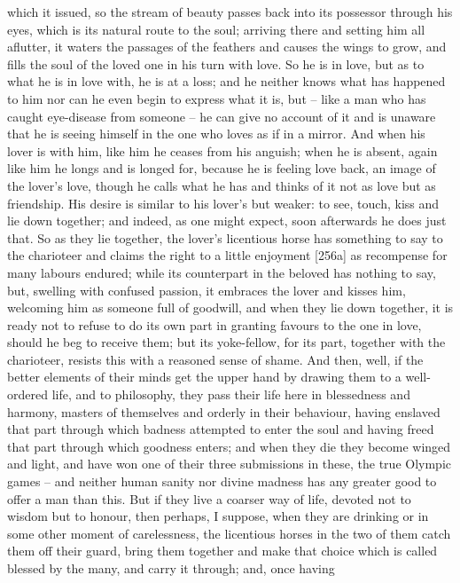  which it issued, so the stream of beauty passes back into its
possessor through his
eyes, which is its natural route to the soul; arriving there and setting
him all aflutter, it waters the  passages of the feathers and
causes the wings to grow, and fills the soul of the loved one in his
turn with love. So he is in love, but as to what he is in love with, he
is at a loss; and he neither knows what has happened to him nor can he
even begin to express what it is, but -- like a man who has caught
eye-disease  from someone -- he can give no account of it and is
unaware that he is seeing himself in the one who loves as if in a
mirror. And when his lover is with him, like him he ceases from his
anguish; when he is absent, again like him he longs and is longed for,
because he is feeling love back, an image of the  lover's love,
though he calls what he has and thinks of it not as love but as
friendship. His desire
is similar to his lover's but weaker: to see, touch, kiss and lie down
together; and indeed, as one might expect, soon afterwards he does just
that. So as  they lie together, the lover's licentious horse has
something to say to the charioteer and claims the right to a little
enjoyment {[}256a{]} as recompense for many labours endured; while its
counterpart in the beloved has nothing to say, but, swelling with
confused passion, it embraces the lover and kisses him, welcoming him as
someone full of goodwill, and when they lie down together, it is ready
not to refuse to do its own part in granting favours  to the one
in love, should he beg to receive them; but its yoke-fellow, for its
part, together with the charioteer, resists this with a reasoned sense
of shame. And then, well, if the better elements of their minds get the
upper hand by drawing them to a well-ordered life, and to philosophy,
they pass their life here in  blessedness and harmony, masters
of themselves and orderly in their behaviour, having enslaved that part
through which badness attempted to enter the soul and having freed that
part through which goodness enters; and when they die they become winged
and light, and have won one of their three 
submissions in these,
the true Olympic games -- and neither human sanity nor divine madness
has any greater good to offer  a man than this. But if they live
a coarser way of life, devoted not to wisdom but to honour, then
perhaps, I suppose, when they are drinking or in some other moment of
carelessness, the licentious horses in the two of them catch them off
their guard, bring them together and make that choice which is called
 blessed by the many, and carry it through; and, once having
